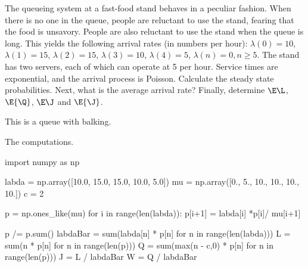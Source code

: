 \begin{exercise}[Hall 5.8]\label{ex:39}
The queueing system at a fast-food stand behaves in a peculiar fashion.
 When there is no one in the queue, people are reluctant to use the stand, fearing that the food is unsavory.
 People are also reluctant to use the stand when the queue is long.
 This yields the following arrival rates (in numbers per hour): $\lambda(0) = 10$, $\lambda(1)=15$, $\lambda(2)=15$, $\lambda(3)=10$, $\lambda(4)=5$, $\lambda(n)=0, n\geq 5$.
 The stand has two servers, each of which can operate at 5 per hour.
 Service times are exponential, and the arrival process is Poisson.
 Calculate the steady state probabilities.
 Next, what is the average arrival rate?
 Finally, determine $\E \L$, $\E{\Q}$, $\E \J$ and $\E{\J}$.
\begin{hint}
This is a queue with balking.
\end{hint}
\begin{solution}
The computations.
\begin{pyblock}
import numpy as np

labda = np.array([10.0, 15.0, 15.0, 10.0, 5.0])
mu = np.array([0., 5., 10., 10., 10., 10.])
c = 2

p = np.ones_like(mu)
for i in range(len(labda)):
    p[i+1] = labda[i] *p[i]/ mu[i+1]

p /= p.sum()
labdaBar = sum(labda[n] * p[n] for n in range(len(labda)))
L = sum(n * p[n] for n in range(len(p)))
Q = sum(max(n - c,0) * p[n] for n in range(len(p)))
J = L / labdaBar
W = Q / labdaBar
\end{pyblock}

\end{solution}
\end{exercise}


